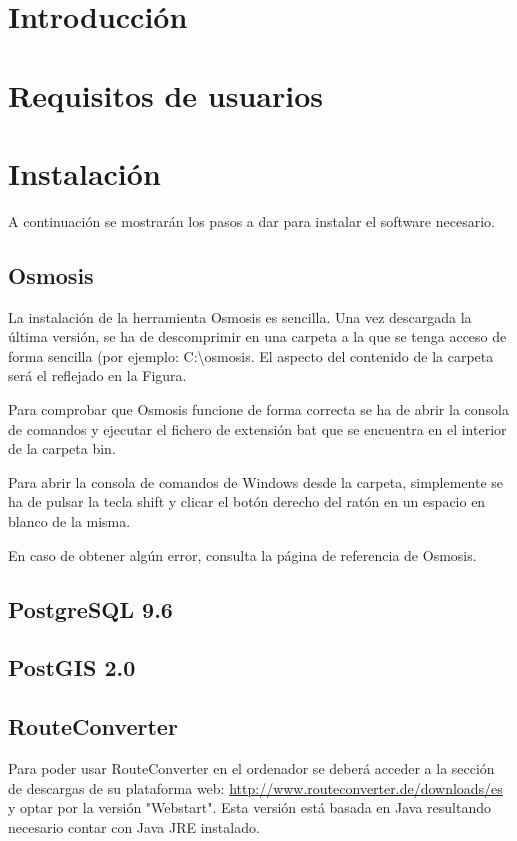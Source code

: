 
\section{Introducción}

\section{Requisitos de usuarios}

\section{Instalación}
A continuación se mostrarán los pasos a dar para instalar el software necesario.

\subsection{Osmosis}
La instalación de la herramienta Osmosis es sencilla. Una vez descargada la última versión, se ha de descomprimir en una carpeta a la que se tenga acceso de forma sencilla (por ejemplo: C:\textbackslash{}osmosis.
El aspecto del contenido de la carpeta será el reflejado en la Figura.

Para comprobar que Osmosis funcione de forma correcta se ha de abrir la consola de comandos y ejecutar el fichero de extensión bat que se encuentra en el interior de la carpeta bin.

Para abrir la consola de comandos de Windows desde la carpeta, simplemente se ha de pulsar la tecla shift y clicar el botón derecho del ratón en un espacio en blanco de la misma.

En caso de obtener algún error, consulta la página de referencia de Osmosis.

\subsection{PostgreSQL 9.6}

\subsection{PostGIS 2.0}

\subsection{RouteConverter}
Para poder usar RouteConverter en el ordenador se deberá acceder a la sección de descargas de su plataforma web: \url{http://www.routeconverter.de/downloads/es} y optar por la versión "Webstart". Esta versión está basada en Java resultando necesario contar con Java JRE instalado.

